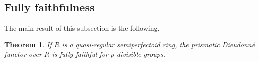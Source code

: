 \documentclass{amsart}
\newcommand{\prism}{{\mathlarger{\mathbbl{\Delta}}}}
\theoremstyle{plain}
\newtheorem{theorem}{Theorem}[subsection]
\theoremstyle{definition}
\newcommand{\Z}{\mathbb{Z}}
\newcommand{\purple}[1]{{\color{black} #1}}
\newcommand{\red}[1]{{\color{black} #1}}
\begin{document}
%  
  
  
\subsection{Fully faithfulness}
\label{sec:fully-faithful-new}
The main result of this subsection is the following. 

\begin{theorem}
  \label{sec:fully-faithf-prism-fully-faithfulness-for-p-torsion-free-quasi-regular semiperfectoid-new}
  \purple{If $R$ is a quasi-regular semiperfectoid ring, the prismatic Dieudonn\'e functor over $R$ is fully faithful for $p$-divisible groups.}
\end{theorem}
\end{document}
